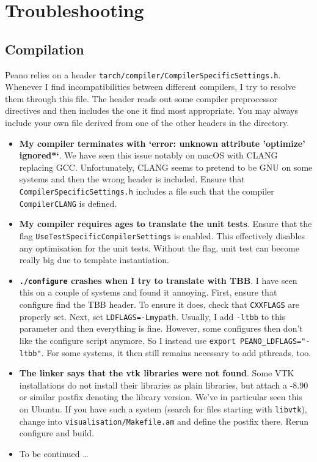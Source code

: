 \chapter{Troubleshooting}

\section{Compilation}

Peano relies on a header \texttt{tarch/compiler/CompilerSpecificSettings.h}.
Whenever I find incompatibilities between different compilers, I try to resolve them through this file. 
The header reads out some compiler preprocessor directives and then includes the
one it find most appropriate. 
You may always include your own file derived from one of the other headers in
the directory.


\begin{itemize}
  \item \textbf{ My compiler terminates with `error: unknown
   attribute 'optimize' ignored*`}. We have seen this issue notably on macOS
   with CLANG replacing GCC. Unfortunately, CLANG seems to pretend to be GNU on
   some systems and then the wrong header is included. Ensure that
   \texttt{CompilerSpecificSettings.h} includes a file such that the compiler
   \linebreak
   \texttt{CompilerCLANG} is defined.
  \item \textbf{ My compiler requires ages to translate the unit tests}. Ensure
  that the flag \linebreak \texttt{UseTestSpecificCompilerSettings} is enabled.
  This effectively disables any optimisation for the unit tests. Without the
  flag, unit test can become really big due to template instantiation.
  \item \textbf{\texttt{./configure} crashes when I try to translate with TBB}.
  I have seen this on a couple of systems and found it annoying. 
  First, ensure that configure
  find the TBB header. To ensure it does, check that \texttt{CXXFLAGS} are properly
  set. Next, set \texttt{LDFLAGS=-Lmypath}. Usually, I add \texttt{-ltbb} to 
  this parameter and then everything is fine. However, some configures then don't 
  like the configure script anymore. So I instead use \texttt{export PEANO\_LDFLAGS="-ltbb"}. 
  For some systems, it then still remains necessary to add pthreads, too.
  \item \textbf{The linker says that the vtk libraries were not found}.
  Some VTK installations do not install their libraries as plain libraries, but 
  attach a -8.90 or similar postfix denoting the library version. We've in particular
  seen this on Ubuntu. If you have such a system (search for files starting with 
  \texttt{libvtk}), change into \texttt{visualisation/Makefile.am} and define the
  postfix there. Rerun configure and build.
  \item To be continued \dots
\end{itemize}



